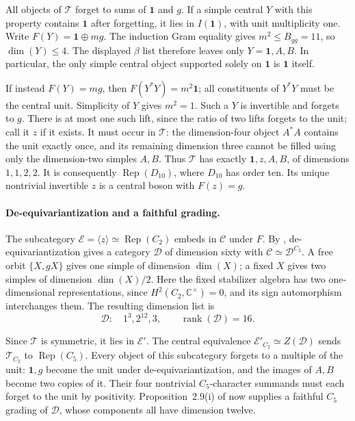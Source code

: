 \documentclass[11pt,a4paper]{article}
\begin{document}
All objects of $\mathcal T$ forget to sums of $\mathbf1$ and $g$.
If a simple central $Y$ with this property contains $\mathbf1$ after
forgetting, it lies in $I(\mathbf1)$, with unit multiplicity one. Write
$F(Y)=\mathbf1\oplus m g$. The induction Gram equality gives
$m^2\le B_{gg}=11$, so $\dim(Y)\le4$. The displayed $\beta$ list
therefore leaves only $Y=\mathbf1,A,B$. In particular, the only simple
central object supported solely on $\mathbf1$ is $\mathbf1$ itself.

If instead $F(Y)=m g$, then $F(Y^*Y)=m^2\mathbf1$; all constituents of
$Y^*Y$ must be the central unit. Simplicity of $Y$ gives $m^2=1$.
Such a $Y$ is invertible and forgets to $g$. There is at most one such
lift, since the ratio of two lifts forgets to the unit; call it $z$ if
it exists. It must occur in $\mathcal T$: the dimension-four object
$A^*A$ contains the unit exactly once, and its remaining dimension three
cannot be filled using only the dimension-two simples $A,B$.
Thus $\mathcal T$ has exactly $\mathbf1,z,A,B$, of dimensions $1,1,2,2$.
It is consequently $\operatorname{Rep}(D_{10})$, where $D_{10}$ has order
ten. Its unique nontrivial invertible $z$ is a central boson with $F(z)=g$.

\paragraph{De-equivariantization and a faithful grading.}
The subcategory $\mathcal E=\langle z\rangle\simeq\operatorname{Rep}(C_2)$
embeds in $\mathcal C$ under $F$. By
\cite[Proposition~2.10]{ENOSolvable}, de-equivariantization gives a
category $\mathcal D$ of dimension sixty with
$\mathcal C\simeq\mathcal D^{C_2}$.
A free orbit $\{X,gX\}$ gives one simple of dimension $\dim(X)$;
a fixed $X$ gives two simples of dimension $\dim(X)/2$.
Here the fixed stabilizer algebra has two one-dimensional representations,
since $H^2(C_2,\mathbb C^\times)=0$, and its sign automorphism interchanges
them. The resulting dimension list is
\[
 \mathcal D:\quad 1^3,2^{12},3,
 \qquad \operatorname{rank}(\mathcal D)=16.
\]

Since $\mathcal T$ is symmetric, it lies in $\mathcal E'$.
The central equivalence $\mathcal E'_{C_2}\simeq Z(\mathcal D)$ sends
$\mathcal T_{C_2}$ to $\operatorname{Rep}(C_5)$.
Every object of this subcategory forgets to a multiple of the unit:
$\mathbf1,g$ become the unit under de-equivariantization, and the images
of $A,B$ become two copies of it. Their four nontrivial $C_5$-character
summands must each forget to the unit by positivity.
Proposition~2.9(i) of \cite{ENOSolvable} now supplies a faithful $C_5$
grading of $\mathcal D$, whose components all have dimension twelve.
\end{document}
